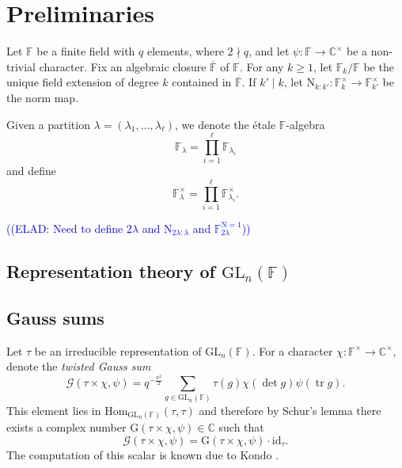 \documentclass[12pt, reqno]{amsart}
\theoremstyle{definition}
\theoremstyle{definition}
\theoremstyle{definition}
\newcommand{\cComplex}{\mathbb{C}}
\newcommand{\multiplicativegroup}[1]{#1^{\times}}
\newcommand{\Hom}{\mathrm{Hom}}
\newcommand{\idmap}{\mathrm{id}}
\newcommand{\etale}{\'etale }
\newcommand{\fieldCharacter}{\psi}
\newcommand{\trace}{\operatorname{tr}}
\newcommand{\GL}{\mathrm{GL}}
\newcommand{\FieldNorm}[2]{\mathrm{N}_{#1:#2}}
\newcommand{\aFieldNorm}{\mathrm{N}}
\newcommand{\finiteField}{\mathbb{F}}
\newcommand{\finiteFieldExtension}[1]{\finiteField_{#1}}
\newcommand{\NormOneGroup}[1]{\finiteFieldExtension{#1}^{\aFieldNorm = 1}}
\newcommand{\algebraicClosure}[1]{\overline{#1}}
\newcommand{\GaussSum}[2]{\mathcal{G}\left(#1, #2\right)}
\newcommand{\GaussSumScalar}[2]{\mathrm{G}\left(#1, #2\right)}
\newcommand{\elad}[1]{\textcolor{blue}{\sffamily ((ELAD: #1))}}
\begin{document}
\section{Preliminaries}
Let $\finiteField$ be a finite field with $q$ elements, where $2 \nmid q$, and let $\fieldCharacter \colon \finiteField \to \multiplicativegroup{\cComplex}$ be a non-trivial character. Fix an algebraic closure $\algebraicClosure{\finiteField}$ of $\finiteField$. For any $k \ge 1$, let $\finiteFieldExtension{k} \slash \finiteField$ be the unique field extension of degree $k$ contained in $\algebraicClosure{\finiteField}$. If $k' \mid k$, let $\FieldNorm{k}{k'} \colon \multiplicativegroup{\finiteFieldExtension{k}} \to \multiplicativegroup{\finiteFieldExtension{k'}}$ be the norm map.

Given a partition $\lambda = \left(\lambda_1, \dots, \lambda_\ell\right)$, we denote the \etale $\finiteField$-algebra $$\finiteFieldExtension{\lambda} = \prod_{i=1}^{\ell} \finiteFieldExtension{\lambda_i}$$ and define
$$\multiplicativegroup{\finiteFieldExtension{\lambda}} = \prod_{i=1}^{\ell} \multiplicativegroup{\finiteFieldExtension{\lambda_i}}.$$

\elad{Need to define $2 \lambda$ and $\FieldNorm{2\lambda}{\lambda}$ and $\NormOneGroup{2 \lambda}$}

\subsection{Representation theory of $\GL_n\left(\finiteField\right)$}

\subsection{Gauss sums}

Let $\tau$ be an irreducible representation of $\GL_n\left(\finiteField\right)$. 
For a character $\chi \colon \multiplicativegroup{\finiteField} \to \multiplicativegroup{\cComplex}$, denote the \emph{twisted Gauss sum}
$$\GaussSum{\tau \times \chi}{\fieldCharacter} = q^{-\frac{n^2}{2}} \sum_{g \in \GL_n\left(\finiteField\right)} \tau\left(g\right) \chi\left(\det g\right) \fieldCharacter\left(\trace g\right).$$
This element lies in $\Hom_{\GL_n\left(\finiteField\right)}\left(\tau, \tau\right)$ and therefore by Schur's lemma there exists a complex number $\GaussSumScalar{\tau \times \chi}{\fieldCharacter} \in \cComplex$ such that
$$\GaussSum{\tau \times \chi}{\fieldCharacter} = \GaussSumScalar{\tau \times \chi}{\fieldCharacter} \cdot \idmap_\tau.$$ The computation of this scalar is known due to Kondo \cite{Kondo1963}.
\end{document}
